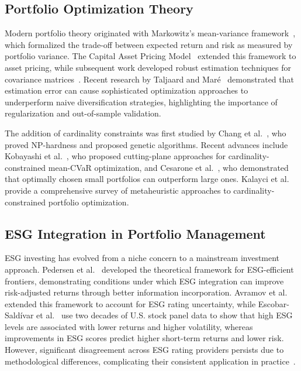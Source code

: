 \documentclass[10pt,twocolumn,a4paper]{article}
\begin{document}
\subsection{Portfolio Optimization Theory}

Modern portfolio theory originated with Markowitz's mean-variance framework~\cite{markowitz1952portfolio}, which formalized the trade-off between expected return and risk as measured by portfolio variance. The Capital Asset Pricing Model~\cite{sharpe1964capital} extended this framework to asset pricing, while subsequent work developed robust estimation techniques for covariance matrices~\cite{ledoit2004honey, ledoit2020analytical}. Recent research by Taljaard and Mar\'{e}~\cite{taljaard2021portfolio} demonstrated that estimation error can cause sophisticated optimization approaches to underperform naive diversification strategies, highlighting the importance of regularization and out-of-sample validation.

The addition of cardinality constraints was first studied by Chang et al.~\cite{chang2000heuristics}, who proved NP-hardness and proposed genetic algorithms. Recent advances include Kobayashi et al.~\cite{kobayashi2021bilevel}, who proposed cutting-plane approaches for cardinality-constrained mean-CVaR optimization, and Cesarone et al.~\cite{cesarone2016small}, who demonstrated that optimally chosen small portfolios can outperform large ones. Kalayci et al.~\cite{kalayci2019comprehensive} provide a comprehensive survey of metaheuristic approaches to cardinality-constrained portfolio optimization.

\subsection{ESG Integration in Portfolio Management}

ESG investing has evolved from a niche concern to a mainstream investment approach. Pedersen et al.~\cite{pedersen2021responsible} developed the theoretical framework for ESG-efficient frontiers, demonstrating conditions under which ESG integration can improve risk-adjusted returns through better information incorporation. Avramov et al.~\cite{avramov2023sustainable} extended this framework to account for ESG rating uncertainty, while Escobar-Saldívar et al.~\cite{escobar2025esg} use two decades of U.S. stock panel data to show that high ESG levels are associated with lower returns and higher volatility, whereas improvements in ESG scores predict higher short-term returns and lower risk. However, significant disagreement across ESG rating providers persists due to methodological differences, complicating their consistent application in practice~\cite{berg2022aggregate}.
\end{document}
